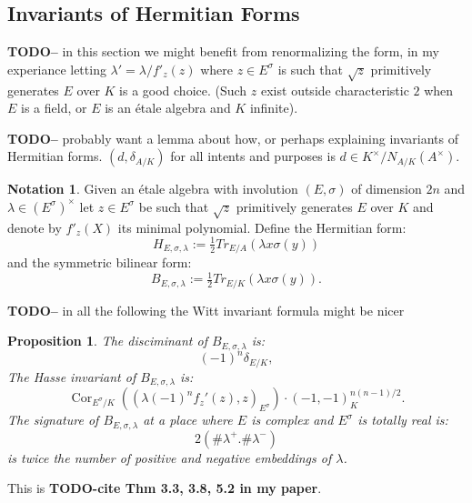 \documentclass{article}
\theoremstyle{plain}
\newtheorem{proposition}[theorem]{Proposition}
\theoremstyle{definition}
\newtheorem{notation}[theorem]{Notation}
\numberwithin{equation}{section}
\DeclareMathOperator{\Cor}{Cor}
\newcommand{\TODO}[1]{\textbf{TODO-#1}}
\begin{document}
\subsection{Invariants of Hermitian Forms}

\TODO - in this section we might benefit from renormalizing the form, in my experiance letting $\lambda' = \lambda/f'_z(z)$ where $z\in E^\sigma$ is such that $\sqrt{z}$ primitively generates $E$ over $K$ is a good choice.
(Such $z$ exist outside characteristic $2$ when $E$ is a field, or $E$ is an \'etale algebra and $K$ infinite).

\TODO - probably want a lemma about how, or perhaps explaining invariants of Hermitian forms.
$(d,\delta_{A/K}) $ for all intents and purposes is $d \in K^\times/N_{A/K}(A^\times)$.

\begin{notation}
Given an \'etale algebra with involution $(E,\sigma)$ of dimension $2n$ and $\lambda \in (E^\sigma)^\times$ let $z\in E^\sigma$ be such that $\sqrt{z}$ primitively generates $E$ over $K$ and denote by $f'_z(X)$ its minimal polynomial.
Define the Hermitian form:
\[ H_{E,\sigma,\lambda} := \tfrac{1}{2}Tr_{E/A}\left(\lambda x\sigma(y)\right) \]
and the symmetric bilinear form:
\[ B_{E,\sigma,\lambda} := \tfrac{1}{2}Tr_{E/K}\left(\lambda x\sigma(y)\right). \]
\end{notation}

\TODO - in all the following the Witt invariant formula might be nicer

\begin{proposition}\label{prop:Hasse}
The disciminant of $B_{E,\sigma,\lambda}$ is:
\[  (-1)^n\delta_{E/K}, \]
The Hasse invariant of $B_{E,\sigma,\lambda}$ is:
\[  \Cor_{E^\sigma/K}((\lambda (-1)^n f_z'(z), z)_{E^\sigma})\cdot(-1,-1)_K^{n(n-1)/2}.\] 
The signature of $B_{E,\sigma,\lambda}$ at a place where $E$ is complex and $E^\sigma$ is totally real is:
\[ 2(\#\lambda^+. \#\lambda^-) \]
is twice the number of positive and negative embeddings of $\lambda$.
\end{proposition}
This is \TODO{cite Thm 3.3, 3.8, 5.2 in my paper}.
\end{document}
